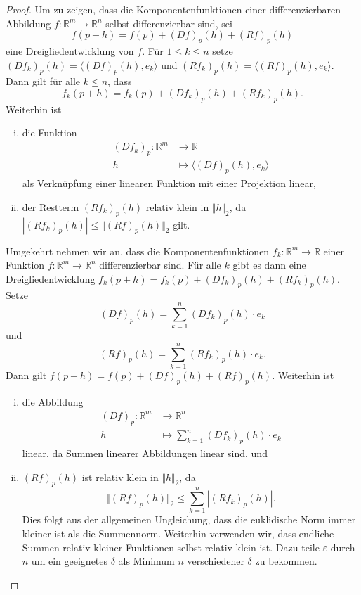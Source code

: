 \documentclass[../main.tex]{subfiles}
\begin{document}
\begin{proof}
  Um zu zeigen, dass die Komponentenfunktionen einer
  differenzierbaren Abbildung $f \colon \mathbb{R}^m \to \mathbb{R}^n$
  selbst differenzierbar sind, sei
  \[
    f(p + h) = f(p) + {(Df)}_p(h) + {(Rf)}_p(h)
  \]
  eine Dreigliedentwicklung von $f$.
  Für $1 \leq k \leq n$
  setze ${(Df_k)}_p(h) = \langle {(Df)}_p(h), e_k \rangle$
  und ${(Rf_k)}_p(h) = \langle {(Rf)}_p(h), e_k \rangle$.
  Dann gilt für alle $k \leq n$, dass
  \[
    f_k(p + h) = f_k(p) + {(Df_k)}_p(h) + {(Rf_k)}_p(h).
  \]
  Weiterhin ist
  \begin{enumerate}[(i)]
    \item die Funktion
      \begin{align*}
        {(Df_k)}_p \colon \mathbb{R}^m & \to \mathbb{R} \\
        h & \mapsto \langle {(Df)}_p(h), e_k \rangle
      \end{align*}
      als Verknüpfung einer linearen Funktion mit einer Projektion
      linear,
    \item der Restterm ${(Rf_k)}_p(h)$ relativ klein
      in $\Vert h \Vert_2$, da
      \(
        |{(Rf_k)}_p(h)| \leq \Vert {(Rf)}_p(h) \Vert_2
      \)
      gilt.
  \end{enumerate}

  Umgekehrt nehmen wir an, dass die Komponentenfunktionen
  $f_k \colon \mathbb{R}^m \to \mathbb{R}$
  einer Funktion $f \colon \mathbb{R}^m \to \mathbb{R}^n$
  differenzierbar sind.
  Für alle $k$ gibt es dann eine Dreigliedentwicklung
  \(
    f_k(p + h) = f_k(p) + {(Df_k)}_p(h) + {(Rf_k)}_p(h).
  \)
  Setze
  \[
    {(Df)}_p(h) = \sum_{k=1}^{n} {(Df_k)}_p(h) \cdot e_k
  \]
  und
  \[
    {(Rf)}_p(h) = \sum_{k=1}^{n} {(Rf_k)}_p(h) \cdot e_k.
  \]
  Dann gilt
  \(
    f(p + h) = f(p) + {(Df)}_p(h) + {(Rf)}_p(h).
  \)
  Weiterhin ist
  \begin{enumerate}[(i)]
    \item die Abbildung
      \begin{align*}
        {(Df)}_p \colon \mathbb{R}^m & \to \mathbb{R}^n \\
        h & \mapsto \sum_{k=1}^{n} {(Df_k)}_p(h) \cdot e_k
      \end{align*}
      linear, da Summen linearer Abbildungen linear sind, und
    \item ${(Rf)}_p(h)$ ist relativ klein in $\Vert h \Vert_2$,
      da
      \[
        \Vert {(Rf)}_p(h) \Vert_2 \leq \sum_{k=1}^{n} |{(Rf_k)}_p(h)|.
      \]
      Dies folgt aus der allgemeinen Ungleichung, dass
      die euklidische Norm immer kleiner ist als die Summennorm.
      Weiterhin verwenden wir, dass endliche Summen
      relativ kleiner Funktionen selbst relativ klein ist.
      Dazu teile $\varepsilon$ durch $n$ um ein geeignetes
      $\delta$ als Minimum $n$ verschiedener $\delta$ zu bekommen.
      \qedhere
  \end{enumerate}
\end{proof}
\end{document}

